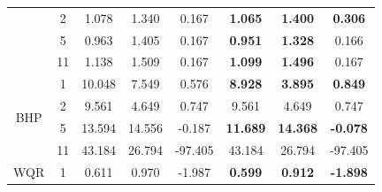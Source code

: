 \begin{table}[tbp]
{\begin{tabular}{|c|c|ccc|ccc|}
                                   & 2                                & \multicolumn{1}{c|}{1.078}          & \multicolumn{1}{c|}{1.340}          & 0.167                  & \multicolumn{1}{c|}{\textbf{1.065}}  & \multicolumn{1}{c|}{\textbf{1.400}}  & \textbf{0.306}                  \\ \cline{2-8} 
                                   & 5                                & \multicolumn{1}{c|}{0.963}          & \multicolumn{1}{c|}{1.405}          & 0.167                  & \multicolumn{1}{c|}{\textbf{0.951}}  & \multicolumn{1}{c|}{\textbf{1.328}}  & 0.166                           \\ \cline{2-8} 
                                   & 11                               & \multicolumn{1}{c|}{1.138}          & \multicolumn{1}{c|}{1.509}          & 0.167                  & \multicolumn{1}{c|}{\textbf{1.099}}  & \multicolumn{1}{c|}{\textbf{1.496}}  & 0.167                           \\ \hline
\multirow{4}{*}{BHP}               & 1                                & \multicolumn{1}{c|}{10.048}         & \multicolumn{1}{c|}{7.549}          & 0.576                  & \multicolumn{1}{c|}{\textbf{8.928}}  & \multicolumn{1}{c|}{\textbf{3.895}}  & \textbf{0.849}                  \\ \cline{2-8} 
                                   & 2                                & \multicolumn{1}{c|}{9.561}          & \multicolumn{1}{c|}{4.649}          & 0.747                  & \multicolumn{1}{c|}{9.561}           & \multicolumn{1}{c|}{4.649}           & 0.747                           \\ \cline{2-8} 
                                   & 5                                & \multicolumn{1}{c|}{13.594}         & \multicolumn{1}{c|}{14.556}         & -0.187                 & \multicolumn{1}{c|}{\textbf{11.689}} & \multicolumn{1}{c|}{\textbf{14.368}} & \textbf{-0.078}                 \\ \cline{2-8} 
                                   & 11                               & \multicolumn{1}{c|}{43.184}         & \multicolumn{1}{c|}{26.794}         & -97.405                & \multicolumn{1}{c|}{43.184}          & \multicolumn{1}{c|}{26.794}          & -97.405                         \\ \hline
\multirow{4}{*}{WQR}               & 1                                & \multicolumn{1}{c|}{0.611}          & \multicolumn{1}{c|}{0.970}          & -1.987                 & \multicolumn{1}{c|}{\textbf{0.599}}  & \multicolumn{1}{c|}{\textbf{0.912}}  & \textbf{-1.898}                 \\ \cline{2-8} 

\end{tabular}}
\end{table}
